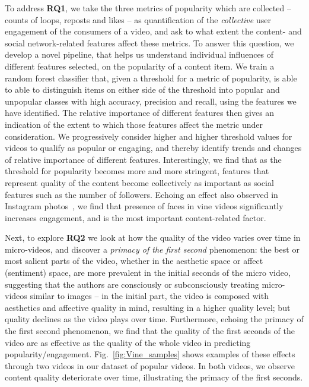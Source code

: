 To address \textbf{RQ1}, we take the three metrics of popularity which are collected -- counts of loops, reposts and likes -- as quantification of the \emph{collective} user engagement of the consumers of a video, and ask to what extent the content- and social network-related features affect these metrics. To answer this question, we develop a novel pipeline, that helps us understand individual influences of different features selected, on the popularity of a content item.
We train a random forest classifier that, given a threshold for a metric of popularity, is able to able to distinguish items on either side of the threshold into popular and unpopular classes  with high accuracy, precision and recall, using the features we have identified. The relative importance of different features then gives an indication of the extent to which those features affect the metric under consideration. We progressively consider higher and higher threshold values for videos to qualify as popular or engaging, and thereby identify trends and changes of relative importance of different features. Interestingly, we find that as the threshold for popularity becomes more and more stringent, features that represent quality of the content become collectively as important as social features such as the number of followers. Echoing an effect also observed in Instagram photos~\cite{bakhshi2014faces}, we find that presence of faces in vine videos significantly increases engagement, and is the most important content-related factor.

Next, to explore \textbf{RQ2} we look at how the quality of the video varies over time in micro-videos, and discover a \emph{primacy of the first second} phenomenon: the best or most salient parts of the video, whether in the aesthetic space or affect (sentiment) space, are more prevalent in the initial seconds of the micro video, suggesting that the authors are consciously or subconsciously treating micro-videos similar to images -- in the initial part, the video is composed with aesthetics and affective quality in mind, resulting in a higher quality level; but quality declines as the video plays over time. Furthermore, echoing the primacy of the first second phenomenon, we find that the quality of the first seconds of the video are as effective as the quality of the whole video in predicting popularity/engagement. Fig.~\ref{fig:Vine_samples} shows examples of these effects through two videos in our dataset of popular videos. In both videos, we observe content quality deteriorate over time, illustrating the primacy of the first seconds. 

